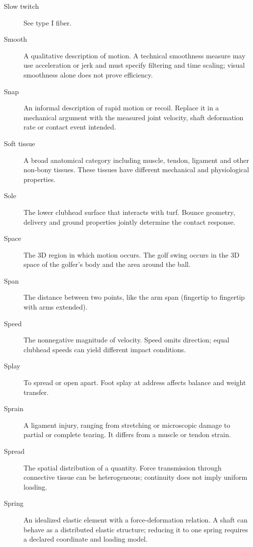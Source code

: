 \begin{description}
\item[Slow twitch] See type I fiber.

\item[Smooth] A qualitative description of motion. A technical smoothness measure may use acceleration or jerk and must specify filtering and time scaling; visual smoothness alone does not prove efficiency.

\item[Snap] An informal description of rapid motion or recoil. Replace it in a mechanical argument with the measured joint velocity, shaft deformation rate or contact event intended.

\item[Soft tissue] A broad anatomical category including muscle, tendon, ligament and other non-bony tissues. These tissues have different mechanical and physiological properties.

\item[Sole] The lower clubhead surface that interacts with turf. Bounce geometry, delivery and ground properties jointly determine the contact response.

\item[Space] The 3D region in which motion occurs. The golf swing occurs in the 3D space of the golfer's body and the area around the ball.

\item[Span] The distance between two points, like the arm span (fingertip to fingertip with arms extended).

\item[Speed] The nonnegative magnitude of velocity. Speed omits direction; equal clubhead speeds can yield different impact conditions.

\item[Splay] To spread or open apart. Foot splay at address affects balance and weight transfer.

\item[Sprain] A ligament injury, ranging from stretching or microscopic damage to partial or complete tearing. It differs from a muscle or tendon strain.

\item[Spread] The spatial distribution of a quantity. Force transmission through connective tissue can be heterogeneous; continuity does not imply uniform loading.

\item[Spring] An idealized elastic element with a force-deformation relation. A shaft can behave as a distributed elastic structure; reducing it to one spring requires a declared coordinate and loading model.


\end{description}
